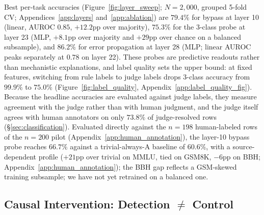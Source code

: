 \documentclass[10pt]{article} %
\begin{document}
Best per-task accuracies (Figure~\ref{fig:layer_sweep}; $N = 2{,}000$, grouped 5-fold CV; Appendices~\ref{app:layers} and~\ref{app:ablation}) are $79.4\%$ for bypass at layer 10 (linear, AUROC $0.85$, $+12.2$pp over majority), $75.3\%$ for the 3-class probe at layer 23 (MLP, $+8.1$pp over majority and $+29$pp over chance on a balanced subsample), and $86.2\%$ for error propagation at layer 28 (MLP; linear AUROC peaks separately at $0.78$ on layer 22). These probes are predictive readouts rather than mechanistic explanations, and label quality sets the upper bound: at fixed features, switching from rule labels to judge labels drops 3-class accuracy from $99.9\%$ to $75.0\%$ (Figure~\ref{fig:label_quality}, Appendix~\ref{app:label_quality_fig}). Because the headline accuracies are evaluated against judge labels, they measure agreement with the judge rather than with human judgment, and the judge itself agrees with human annotators on only $73.8\%$ of judge-resolved rows (\S\ref{sec:classification}). Evaluated directly against the $n = 198$ human-labeled rows of the $n = 200$ pilot (Appendix~\ref{app:human_annotation}), the layer-10 bypass probe reaches $66.7\%$ against a trivial-always-A baseline of $60.6\%$, with a source-dependent profile ($+21$pp over trivial on MMLU, tied on GSM8K, $-6$pp on BBH; Appendix~\ref{app:human_annotation}); the BBH gap reflects a GSM-skewed training subsample; we have not yet retrained on a balanced one.

\subsection{Causal Intervention: Detection \texorpdfstring{$\neq$}{!=} Control}
\label{sec:steering}
\end{document}
